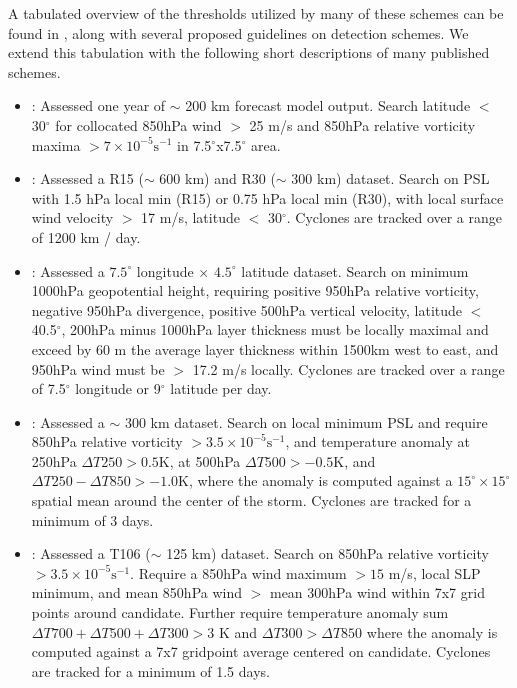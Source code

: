 \documentclass[gmdd, hvmath, online]{copernicus_discussions}
\begin{document}
A tabulated overview of the thresholds utilized by many of these schemes can be found in \cite{walsh2007objectively}, along with several proposed guidelines on detection schemes.  We extend this tabulation with the following short descriptions of many published schemes.

\begin{itemize}

\item \cite{bengtsson1982vortices}: Assessed one year of $\sim$ 200 km forecast model output. Search latitude $<$ 30$^\circ$ for collocated 850hPa wind $>$ 25 m/s and 850hPa relative vorticity maxima $> 7 \times 10^{-5} \mbox{s}^{-1}$ in 7.5$^\circ$x7.5$^\circ$ area.

\item \cite{broccoli1990existing}: Assessed a R15 ($\sim$ 600 km) and R30 ($\sim$ 300 km) dataset.  Search on PSL with 1.5 hPa local min (R15) or 0.75 hPa local min (R30), with local surface wind velocity $>$ 17 m/s, latitude $<$ 30$^\circ$.  Cyclones are tracked over a range of 1200 km / day.

\item \cite{wu1992gcm}: Assessed a $7.5^\circ$ longitude $\times$ $4.5^\circ$ latitude dataset.  Search on minimum 1000hPa geopotential height, requiring positive 950hPa relative vorticity, negative 950hPa divergence, positive 500hPa vertical velocity, latitude $<$ 40.5$^\circ$, 200hPa minus 1000hPa layer thickness must be locally maximal and exceed by 60 m the average layer thickness within 1500km west to east, and 950hPa wind must be $>$ 17.2 m/s locally.  Cyclones are tracked over a range of 7.5$^\circ$ longitude or 9$^\circ$ latitude per day.

\item \cite{haarsma1993tropical}: Assessed a $\sim$ 300 km dataset.  Search on local minimum PSL and require 850hPa relative vorticity $> 3.5 \times 10^{-5} \mbox{s}^{-1}$, and temperature anomaly at 250hPa $\Delta T250 > 0.5 \mbox{K}$, at 500hPa $\Delta T500 > -0.5 \mbox{K}$, and $\Delta T250 - \Delta T850 > -1.0 \mbox{K}$, where the anomaly is computed against a $15^\circ \times 15^\circ$ spatial mean around the center of the storm.  Cyclones are tracked for a minimum of 3 days.

\item \cite{bengtsson1995hurricane, bengtsson1996will}:  Assessed a T106 ($\sim$ 125 km) dataset.  Search on 850hPa relative vorticity $> 3.5 \times 10^{-5} \mbox{s}^{-1}$.  Require a 850hPa wind maximum $> 15$ m/s, local SLP minimum, and mean 850hPa wind $>$ mean 300hPa wind within 7x7 grid points around candidate.  Further require temperature anomaly sum $\Delta T700+ \Delta T500+ \Delta T300 > 3$ K and $\Delta T300 > \Delta T850$ where the anomaly is computed against a 7x7 gridpoint average centered on candidate.  Cyclones are tracked for a minimum of 1.5 days.


\end{itemize}
\end{document}
